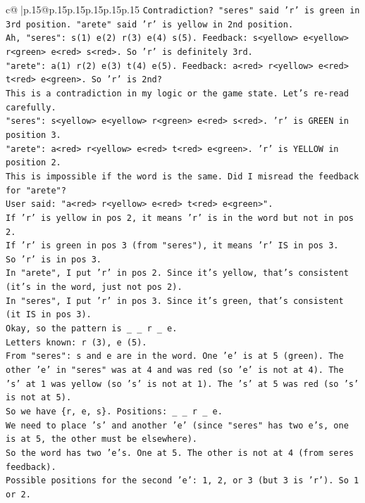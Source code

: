 \documentclass{article}
\begin{document}
{\begin{supertabular}{c@{$\;$}|p{.15\linewidth}@{}p{.15\linewidth}p{.15\linewidth}p{.15\linewidth}p{.15\linewidth}p{.15\linewidth}}
{{{\texttt{Contradiction? "seres" said 'r' is green in 3rd position. "arete" said 'r' is yellow in 2nd position.} \\
\texttt{Ah, "seres": s(1) e(2) r(3) e(4) s(5). Feedback: s<yellow> e<yellow> r<green> e<red> s<red>. So 'r' is definitely 3rd.} \\
\texttt{"arete": a(1) r(2) e(3) t(4) e(5). Feedback: a<red> r<yellow> e<red> t<red> e<green>. So 'r' is 2nd?} \\
\texttt{This is a contradiction in my logic or the game state. Let's re{-}read carefully.} \\
\texttt{"seres": s<yellow> e<yellow> r<green> e<red> s<red>. 'r' is GREEN in position 3.} \\
\texttt{"arete": a<red> r<yellow> e<red> t<red> e<green>. 'r' is YELLOW in position 2.} \\
\texttt{This is impossible if the word is the same. Did I misread the feedback for "arete"?} \\
\texttt{User said: "a<red> r<yellow> e<red> t<red> e<green>".} \\
\texttt{If 'r' is yellow in pos 2, it means 'r' is in the word but not in pos 2.} \\
\texttt{If 'r' is green in pos 3 (from "seres"), it means 'r' IS in pos 3.} \\
\texttt{So 'r' is in pos 3.} \\
\texttt{In "arete", I put 'r' in pos 2. Since it's yellow, that's consistent (it's in the word, just not pos 2).} \\
\texttt{In "seres", I put 'r' in pos 3. Since it's green, that's consistent (it IS in pos 3).} \\
\texttt{Okay, so the pattern is \_ \_ r \_ e.} \\
\texttt{Letters known: r (3), e (5).} \\
\texttt{From "seres": s and e are in the word. One 'e' is at 5 (green). The other 'e' in "seres" was at 4 and was red (so 'e' is not at 4). The 's' at 1 was yellow (so 's' is not at 1). The 's' at 5 was red (so 's' is not at 5).} \\
\texttt{So we have \{r, e, s\}. Positions: \_ \_ r \_ e.} \\
\texttt{We need to place 's' and another 'e' (since "seres" has two e's, one is at 5, the other must be elsewhere).} \\
\texttt{So the word has two 'e's. One at 5. The other is not at 4 (from seres feedback).} \\
\texttt{Possible positions for the second 'e': 1, 2, or 3 (but 3 is 'r'). So 1 or 2.} \\
}}}
\end{supertabular}}
\end{document}
